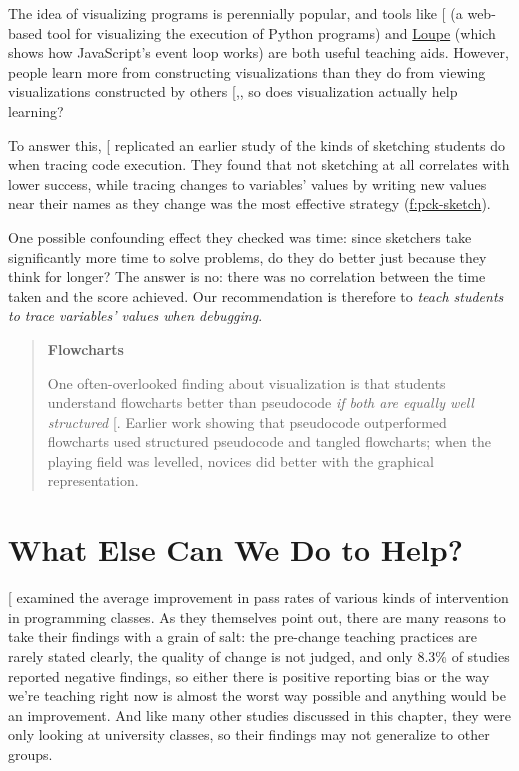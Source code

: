 The idea of visualizing programs is perennially popular, and tools
like {[}\protect[\hyperlink{b:Guo2013}{Guo2013}]{]} (a web-based tool for visualizing the
execution of Python programs) and \href{http://latentflip.com/loupe/}{Loupe} (which shows how
JavaScript's event loop works) are both useful teaching aids.
However, people learn more from constructing visualizations than they
do from viewing visualizations constructed by others
{[},\protect[\hyperlink{b:Ceti2016}{Ceti2016}]{]}, so does visualization actually
help learning?

To answer this, {[}\protect[\hyperlink{b:Cunn2017}{Cunn2017}]{]} replicated an earlier study of the
kinds of sketching students do when tracing code execution. They found
that not sketching at all correlates with lower success, while tracing
changes to variables' values by writing new values near their names as
they change was the most effective strategy (\protect\hyperlink{FIGURE}{f:pck-sketch}).

One possible confounding effect they checked was time: since sketchers
take significantly more time to solve problems, do they do better just
because they think for longer? The answer is no: there was no
correlation between the time taken and the score achieved. Our
recommendation is therefore to \emph{teach students to trace variables'
values when debugging}.

\begin{quote}\setlength{\parindent}{0pt}
\textbf{Flowcharts}

One often-overlooked finding about visualization is that students
understand flowcharts better than pseudocode \emph{if both are equally well
structured} {[}\protect[\hyperlink{b:Scan1989}{Scan1989}]{]}. Earlier work showing that pseudocode
outperformed flowcharts used structured pseudocode and tangled
flowcharts; when the playing field was levelled, novices did better
with the graphical representation.
\end{quote}

\section{What Else Can We Do to Help?}\label{s:pck-help}

{[}\protect[\hyperlink{b:Viha2014}{Viha2014}]{]} examined the average improvement in pass rates of
various kinds of intervention in programming classes. As they themselves
point out, there are many reasons to take their findings with a grain of
salt: the pre-change teaching practices are rarely stated clearly, the
quality of change is not judged, and only 8.3\% of studies reported
negative findings, so either there is positive reporting bias or the way
we're teaching right now is almost the worst way possible and anything
would be an improvement. And like many other studies discussed in this
chapter, they were only looking at university classes, so their findings
may not generalize to other groups.

